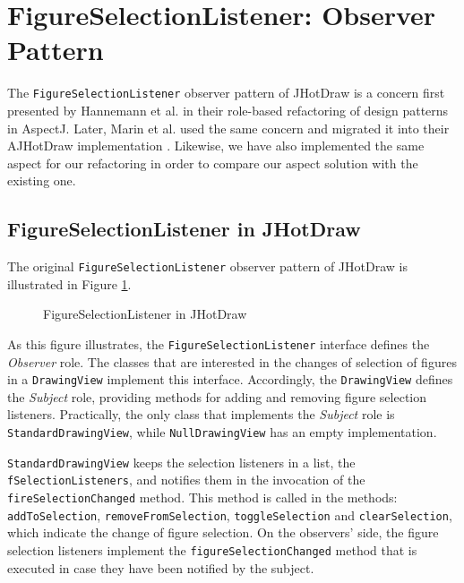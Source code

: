 \section{FigureSelectionListener: Observer Pattern}
The \texttt{FigureSelectionListener} observer pattern of JHotDraw is a concern first presented by Hannemann et al. \cite{hannemann2005role} in their role-based refactoring of design patterns in AspectJ. 
Later, Marin et al. used the same concern and migrated it into their AJHotDraw implementation \cite{marin2005approach}.
Likewise, we have also implemented the same aspect for our refactoring in order to compare our aspect solution with the existing one.

\subsection{FigureSelectionListener in JHotDraw}
The original \texttt{FigureSelectionListener} observer pattern of JHotDraw is illustrated in Figure \ref{fig:JHotDraw_FigureSelectionListener_OOP}.

\begin{figure}[H]
	\centering
  	\caption{FigureSelectionListener in JHotDraw}
  	\label{fig:JHotDraw_FigureSelectionListener_OOP}
\end{figure}

As this figure illustrates, the \texttt{FigureSelectionListener} interface defines the \textit{Observer} role.
The classes that are interested in the changes of selection of figures in a \texttt{DrawingView} implement this interface.
Accordingly, the \texttt{DrawingView} defines the \textit{Subject} role, providing methods for adding and removing figure selection listeners.
Practically, the only class that implements the \textit{Subject} role is \texttt{StandardDrawingView}, while \texttt{NullDrawingView} has an empty implementation.

\texttt{StandardDrawingView} keeps the selection listeners in a list, the \texttt{fSelectionListeners}, and notifies them in the invocation of the \texttt{fireSelectionChanged} method.
This method is called in the methods: \texttt{addToSelection}, \texttt{removeFromSelection}, \texttt{toggleSelection} and \texttt{clearSelection}, which indicate the change of figure selection.
On the observers' side, the figure selection listeners implement the \texttt{figureSelectionChanged} method that is executed in case they have been notified by the subject.

